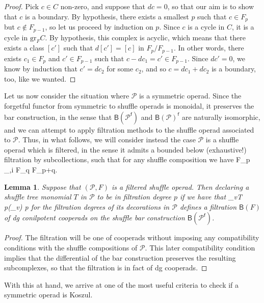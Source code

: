 \documentclass[fleqn, a4paper, twoside]{article}
\makeatletter
\newcommand{\0}{\langle 0\rangle}
\newcommand{\B}[1]{\mathsf{B}(#1)}
\newcommand{\f}{\mathsf{f}}
\let\[\@undefined
\DeclareRobustCommand{\[}{\begin{equation}}%
\let\]\@undefined
\DeclareRobustCommand{\]}{\end{equation}}%
\theoremstyle{mytheorem}
\newtheorem{lemma}[theorem]{Lemma}
\theoremstyle{introthm}
\theoremstyle{mydefinition}
\theoremstyle{mydefinition2}
\theoremstyle{plain} %
\newcommand{\?}{\,?\,}
\newcommand{\PP}{{\mathcal{P}}}
\theoremstyle{mytheorem}
\theoremstyle{plain} %
\makeatother
\begin{document}
  \begin{proof}
  Pick $c\in C$ non-zero, 
  and suppose that $dc=0$,
  so that our aim is to show that $c$ is a boundary.
  By hypothesis, there exists a smallest $p$
  such that $c\in F_p$ but $c\notin F_{p-1}$,
  so let us proceed by induction on $p$.
  Since $c$ is a cycle in $C$, it is a cycle
  in $\mathrm{gr}_F C$. 
  By hypothesis, this complex is acyclic, 
  which means that there exists a class $[c']$
  such that $d[c'] = [c]$ in $F_p/F_{p-1}$. In
  other words, there exists $c_1\in F_p$ and
  $c'\in F_{p-1}$ such that
  $c- dc_1 = c'\in F_{p-1}$.
 Since $dc' = 0$, we know by induction that $c'=dc_2$
 for some $c_2$, and so $c = dc_1+dc_2$ is a
 boundary, too, like we wanted.
  \end{proof}
  
 Let us now consider the situation where $\PP$
 is a symmetric operad. Since the forgetful
 functor from symmetric to shuffle operads is
 monoidal, it preserves the bar construction,
 in the sense that $\B{\PP^\f}$ and
 $\B{\PP}^\f$ are naturally isomorphic,
 and we can attempt to apply filtration methods
 to the shuffle operad associated to $\PP$.
 Thus, in what follows, we will consider instead
 the case $\PP$ is a shuffle operad which is
 filtered, in the sense it admits a bounded
 below (exhaustive!) filtration by subcollections,
 such that for any shuffle composition we have
 \[
 F_p \circ_{\sigma,i} F_q \subseteq
  F_{p+q}.
 \]
 
 \begin{lemma}
 Suppose that $(\PP,F)$ is a filtered shuffle operad.
 Then declaring a shuffle tree monomial $T$ in $\PP$
 to be in filtration degree $p$ if we have that
 \[\sum_{v\in T} p(_v) \leqslant p \]
 for the filtration degrees of its decorations
 in $\PP$ defines a filtration $\B{F}$ 
 of dg conilpotent
 cooperads on the shuffle bar construction
 $\B{\PP^\f}$.
 \end{lemma}
 
 \begin{proof}
 The filtration will be one of cooperads without
 imposing any compatibility conditions with the
 shuffle compositions of $\PP$. This
 later compatibility condition implies that
 the differential of the bar construction
 preserves the resulting subcomplexes,
 so that the filtration is in fact of dg
 cooperads.  \end{proof}
 
 With this at hand, we arrive at one of the most
 useful criteria to check if a symmetric operad
 is Koszul.
 
\end{document}
